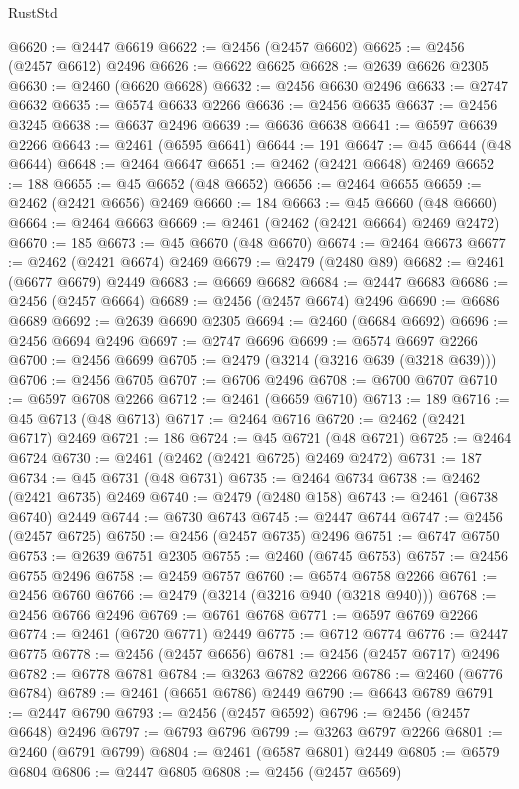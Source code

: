 \begin{lexlean}{RustStd}
\begin{coremodule}
@6620 := @2447 @6619
@6622 := @2456 (@2457 @6602)
@6625 := @2456 (@2457 @6612) @2496
@6626 := @6622 @6625
@6628 := @2639 @6626 @2305
@6630 := @2460 (@6620 @6628)
@6632 := @2456 @6630 @2496
@6633 := @2747 @6632
@6635 := @6574 @6633 @2266
@6636 := @2456 @6635
@6637 := @2456 @3245
@6638 := @6637 @2496
@6639 := @6636 @6638
@6641 := @6597 @6639 @2266
@6643 := @2461 (@6595 @6641)
@6644 := 191
@6647 := @45 @6644 (@48 @6644)
@6648 := @2464 @6647
@6651 := @2462 (@2421 @6648) @2469
@6652 := 188
@6655 := @45 @6652 (@48 @6652)
@6656 := @2464 @6655
@6659 := @2462 (@2421 @6656) @2469
@6660 := 184
@6663 := @45 @6660 (@48 @6660)
@6664 := @2464 @6663
@6669 := @2461 (@2462 (@2421 @6664) @2469 @2472)
@6670 := 185
@6673 := @45 @6670 (@48 @6670)
@6674 := @2464 @6673
@6677 := @2462 (@2421 @6674) @2469
@6679 := @2479 (@2480 @89)
@6682 := @2461 (@6677 @6679) @2449
@6683 := @6669 @6682
@6684 := @2447 @6683
@6686 := @2456 (@2457 @6664)
@6689 := @2456 (@2457 @6674) @2496
@6690 := @6686 @6689
@6692 := @2639 @6690 @2305
@6694 := @2460 (@6684 @6692)
@6696 := @2456 @6694 @2496
@6697 := @2747 @6696
@6699 := @6574 @6697 @2266
@6700 := @2456 @6699
@6705 := @2479 (@3214 (@3216 @639 (@3218 @639)))
@6706 := @2456 @6705
@6707 := @6706 @2496
@6708 := @6700 @6707
@6710 := @6597 @6708 @2266
@6712 := @2461 (@6659 @6710)
@6713 := 189
@6716 := @45 @6713 (@48 @6713)
@6717 := @2464 @6716
@6720 := @2462 (@2421 @6717) @2469
@6721 := 186
@6724 := @45 @6721 (@48 @6721)
@6725 := @2464 @6724
@6730 := @2461 (@2462 (@2421 @6725) @2469 @2472)
@6731 := 187
@6734 := @45 @6731 (@48 @6731)
@6735 := @2464 @6734
@6738 := @2462 (@2421 @6735) @2469
@6740 := @2479 (@2480 @158)
@6743 := @2461 (@6738 @6740) @2449
@6744 := @6730 @6743
@6745 := @2447 @6744
@6747 := @2456 (@2457 @6725)
@6750 := @2456 (@2457 @6735) @2496
@6751 := @6747 @6750
@6753 := @2639 @6751 @2305
@6755 := @2460 (@6745 @6753)
@6757 := @2456 @6755 @2496
@6758 := @2459 @6757
@6760 := @6574 @6758 @2266
@6761 := @2456 @6760
@6766 := @2479 (@3214 (@3216 @940 (@3218 @940)))
@6768 := @2456 @6766 @2496
@6769 := @6761 @6768
@6771 := @6597 @6769 @2266
@6774 := @2461 (@6720 @6771) @2449
@6775 := @6712 @6774
@6776 := @2447 @6775
@6778 := @2456 (@2457 @6656)
@6781 := @2456 (@2457 @6717) @2496
@6782 := @6778 @6781
@6784 := @3263 @6782 @2266
@6786 := @2460 (@6776 @6784)
@6789 := @2461 (@6651 @6786) @2449
@6790 := @6643 @6789
@6791 := @2447 @6790
@6793 := @2456 (@2457 @6592)
@6796 := @2456 (@2457 @6648) @2496
@6797 := @6793 @6796
@6799 := @3263 @6797 @2266
@6801 := @2460 (@6791 @6799)
@6804 := @2461 (@6587 @6801) @2449
@6805 := @6579 @6804
@6806 := @2447 @6805
@6808 := @2456 (@2457 @6569)

\end{coremodule}
\end{lexlean}
